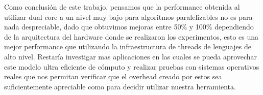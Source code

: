 Como conclusión de este trabajo, pensamos que la performance obtenida al utilizar dual core a un nivel muy bajo para algoritmos paralelizables no es para nada despreciable, dado que obtuvimos mejoras entre 50\% y 100\% dependiendo de la arquitectura del hardware donde se realizaron los experimentos, esto es una mejor performance que utilizando la infraestructura de threads de lenguajes de alto nivel. Restaría investigar mas aplicaciones en las cuales se pueda aprovechar este modelo ultra eficiente de cómputo y realizar pruebas con sistemas operativos reales que nos permitan verificar que el overhead creado por estos sea suficientemente apreciable como para decidir utilizar nuestra herramienta.